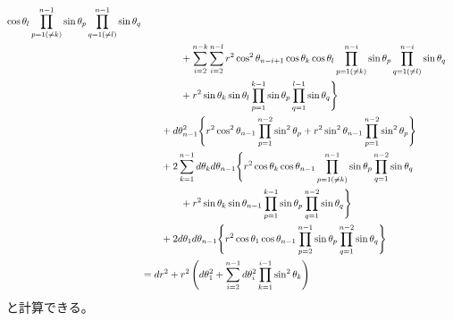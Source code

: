 \begin{align}
        \cos \theta_l
        \prod_{p=1 (\neq k)}^{n-1}
        \sin \theta_p
        \prod_{q=1 (\neq l)}^{n-1}
        \sin \theta_q
\notag\\&\qquad\qquad
    +
    \sum_{i = 2}^{n - k}
    \sum_{i = 2}^{n - l}
        r^2 \cos^2 \theta_{n - i + 1}
        \cos \theta_k
        \cos \theta_l
        \prod_{p=1 (\neq k)}^{n - i}
        \sin \theta_p
        \prod_{q=1 (\neq l)}^{n - i}
        \sin \theta_q
\notag\\&\qquad\qquad
    +
        r^2 \sin \theta_{k}
        \sin \theta_{l}
        \prod_{p=1}^{k - 1}
        \sin \theta_p
        \prod_{q=1}^{l - 1}
        \sin \theta_q
    \Bigg\}
\notag\\&\qquad
    +
    d \theta_{n-1}^2
    \Bigg\{
        r^2 \cos^2 \theta_{n-1}
        \prod_{p=1}^{n-2}
        \sin^2 \theta_p
    +
        r^2 \sin^2 \theta_{n-1}
        \prod_{p=1}^{n - 2}
        \sin^2 \theta_p
    \Bigg\}
\notag\\&\qquad
    +
    2
    \sum_{k = 1}^{n - 1}
    d \theta_k
    d \theta_{n-1}
    \Bigg\{
        r^2 \cos \theta_k
        \cos \theta_{n-1}
        \prod_{p=1 (\neq k)}^{n-1}
        \sin \theta_p
        \prod_{q=1}^{n-2}
        \sin \theta_q
\notag\\&\qquad\qquad
    +
        r^2 \sin \theta_{k}
        \sin \theta_{n-1}
        \prod_{p=1}^{k - 1}
        \sin \theta_p
        \prod_{q=1}^{n-2}
        \sin \theta_q
    \Bigg\}
\notag\\&\qquad
    +
    2
    d \theta_1
    d \theta_{n-1}
    \Bigg\{
        r^2 \cos \theta_1
        \cos \theta_{n-1}
        \prod_{p=2}^{n-1}
        \sin \theta_p
        \prod_{q=1}^{n-2}
        \sin \theta_q
    \Bigg\}
\notag\\&
    =
    d r^2
+
    r^2
\left(
        d \theta_1^2
    +
    \sum_{i=2}^{n-1}
        d\theta_i^2
    \prod_{k=1}^{i-1}
        \sin^2 \theta_k
\right)
\end{align}
と計算できる。

